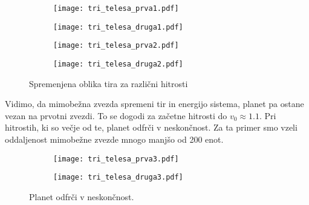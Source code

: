 \documentclass[12pt,a4paper]{article}
\begin{document}
\begin{figure}[H]
    \centering
    \begin{subfigure}[b]{0.45\textwidth}  			
        \texttt{[image: tri\_telesa\_prva1.pdf]}
    \end{subfigure}
    \begin{subfigure}[b]{0.45\textwidth}  			
        \texttt{[image: tri\_telesa\_druga1.pdf]}
    \end{subfigure}
    \begin{subfigure}[b]{0.45\textwidth}  			
        \texttt{[image: tri\_telesa\_prva2.pdf]}
    \end{subfigure}
    \begin{subfigure}[b]{0.45\textwidth}  			
        \texttt{[image: tri\_telesa\_druga2.pdf]}
    \end{subfigure}
    \caption{Spremenjena oblika tira za različni hitrosti} \label{fig:slika8}
\end{figure}
\noindent Vidimo, da mimobežna zvezda spremeni tir in energijo sistema, planet pa ostane vezan na prvotni zvezdi. To se dogodi za začetne hitrosti do $v_0 \approx 1.1$. Pri hitrostih, ki so večje od te, planet odfrči v neskončnost. Za ta primer smo vzeli oddaljenost mimobežne zvezde mnogo manjšo od 200 enot.
\begin{figure}[H]
    \centering
    \begin{subfigure}[b]{0.45\textwidth}  			
        \texttt{[image: tri\_telesa\_prva3.pdf]}
    \end{subfigure}
    \begin{subfigure}[b]{0.45\textwidth}  			
        \texttt{[image: tri\_telesa\_druga3.pdf]}
    \end{subfigure}
    \caption{Planet odfrči v neskončnost.} \label{fig:slika9}
\end{figure}
\end{document}

